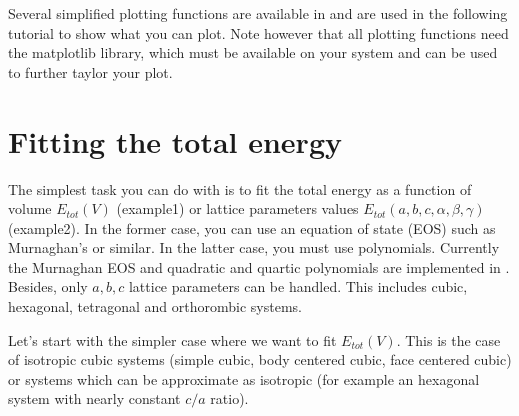 \documentclass[letterpaper,10pt,english]{sphinxmanual}
\begin{document}
Several simplified plotting functions are available in  and are used in the following tutorial to show what you can plot.
Note however that all plotting functions need the matplotlib library, which must be available on your system and can be used to further taylor your plot.


\section{Fitting the total energy}
\label{tutorial:fitting-the-total-energy}
The simplest task you can do with  is to fit the total energy as a function of volume \(E_{tot}(V)\) (example1) or lattice parameters values \(E_{tot}(a,b,c,\alpha,\beta,\gamma)\) (example2). In the former case, you can use
an equation of state (EOS) such as Murnaghan's or similar. In the latter case, you must use polynomials. Currently the Murnaghan EOS and quadratic and quartic polynomials are implemented in . Besides, only \(a,b,c\) lattice parameters can be handled. This includes cubic, hexagonal, tetragonal and orthorombic systems.

Let's start with the simpler case where we want to fit \(E_{tot}(V)\). This is the case of isotropic cubic systems (simple cubic, body centered cubic, face centered cubic) or systems which can be approximate as isotropic (for example an hexagonal system with nearly constant \(c/a\) ratio).

\begin{sphinxVerbatim}[commandchars=\\\{\}]

    

    		
         	

                    	

\end{sphinxVerbatim}
\end{document}
